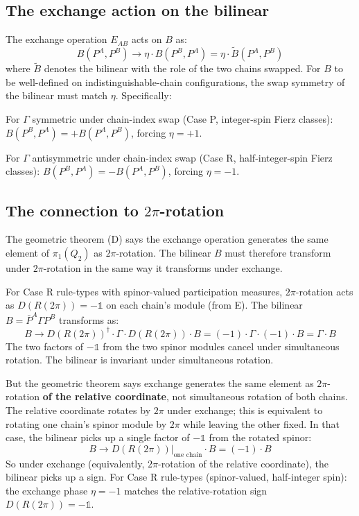 \documentclass[11pt,a4paper]{article}
\begin{document}
\subsection{The exchange action on the bilinear}

The exchange operation $E_{AB}$ acts on $B$ as:
\[
B(P^A, P^B) \to \eta \cdot B(P^B, P^A) = \eta \cdot \tilde B(P^A, P^B)
\]
where $\tilde B$ denotes the bilinear with the role of the two chains swapped. For $B$ to be well-defined on indistinguishable-chain configurations, the swap symmetry of the bilinear must match $\eta$. Specifically:

For $\Gamma$ symmetric under chain-index swap (Case P, integer-spin Fierz classes): $B(P^B, P^A) = +B(P^A, P^B)$, forcing $\eta = +1$.

For $\Gamma$ antisymmetric under chain-index swap (Case R, half-integer-spin Fierz classes): $B(P^B, P^A) = -B(P^A, P^B)$, forcing $\eta = -1$.

\subsection{The connection to $2\pi$-rotation}

The geometric theorem (D) says the exchange operation generates the same element of $\pi_1(Q_2)$ as $2\pi$-rotation. The bilinear $B$ must therefore transform under $2\pi$-rotation in the same way it transforms under exchange.

For Case R rule-types with spinor-valued participation measures, $2\pi$-rotation acts as $D(R(2\pi)) = -\mathbb{1}$ on each chain's module (from E). The bilinear $B = \bar P^A \Gamma P^B$ transforms as:
\[
B \to D(R(2\pi))^\dagger \cdot \Gamma \cdot D(R(2\pi)) \cdot B = (-1) \cdot \Gamma \cdot (-1) \cdot B = \Gamma \cdot B
\]
The two factors of $-\mathbb{1}$ from the two spinor modules cancel under simultaneous rotation. The bilinear is invariant under simultaneous rotation.

But the geometric theorem says exchange generates the same element as $2\pi$-rotation \textbf{of the relative coordinate}, not simultaneous rotation of both chains. The relative coordinate rotates by $2\pi$ under exchange; this is equivalent to rotating one chain's spinor module by $2\pi$ while leaving the other fixed. In that case, the bilinear picks up a single factor of $-\mathbb{1}$ from the rotated spinor:
\[
B \to D(R(2\pi))\big|_{\text{one chain}} \cdot B = (-1) \cdot B
\]
So under exchange (equivalently, $2\pi$-rotation of the relative coordinate), the bilinear picks up a sign. For Case R rule-types (spinor-valued, half-integer spin): the exchange phase $\eta = -1$ matches the relative-rotation sign $D(R(2\pi)) = -\mathbb{1}$.
\end{document}
